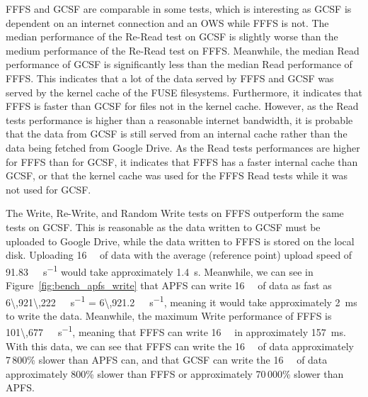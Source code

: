 \gls{FFFS} and \gls{GCSF} are comparable in some tests, which is interesting as \gls{GCSF} is dependent on an internet connection and an \gls{OWS} while \gls{FFFS} is not. The median performance of the \mbox{Re-Read} test on \gls{GCSF} is slightly worse than the medium performance of the \mbox{Re-Read} test on \gls{FFFS}. Meanwhile, the median Read performance of \gls{GCSF} is significantly less than the median Read performance of \gls{FFFS}. This indicates that a lot of the data served by \gls{FFFS} and \gls{GCSF} was served by the kernel cache of the \gls{FUSE} filesystems. Furthermore, it indicates that \gls{FFFS} is faster than \gls{GCSF} for files not in the kernel cache. However, as the Read tests performance is higher than a reasonable internet bandwidth, it is probable that the data from \gls{GCSF} is still served from an internal cache rather than the data being fetched from Google Drive. As the Read tests performances are higher for \gls{FFFS} than for \gls{GCSF}, it indicates that \gls{FFFS} has a faster internal cache than \gls{GCSF}, or that the kernel cache was used for the \gls{FFFS} Read tests while it was not used for \gls{GCSF}.

The Write, \mbox{Re-Write}, and Random Write tests on \gls{FFFS} outperform the same tests on \gls{GCSF}. This is reasonable as the data written to \gls{GCSF} must be uploaded to Google Drive, while the data written to \gls{FFFS} is stored on the local disk. Uploading \SI{16}{\mega\byte} of data with the average (reference point) upload speed of \SI[per-mode = symbol]{91.83}{\mega\bit\per\second} would take approximately \SI{1.4}{\second}. Meanwhile, we can see in Figure~\ref{fig:bench_apfs_write} that \gls{APFS} can write \SI{16}{\mega\byte} of data as fast as \SI[per-mode = symbol]{6\,921\,222}{\kilo\byte\per\second} = \SI[per-mode = symbol]{6\,921.2}{\mega\byte\per\second}, meaning it would take approximately \SI{2}{\milli\second} to write the data. Meanwhile, the maximum Write performance of \gls{FFFS} is \SI[per-mode = symbol]{101\,677}{\kilo\byte\per\second}, meaning that \gls{FFFS} can write \SI{16}{\mega\byte} in approximately \SI{157}{\milli\second}. With this data, we can see that \gls{FFFS} can write the \SI{16}{\mega\byte} of data approximately 7\,800\% slower than \gls{APFS} can, and that \gls{GCSF} can write the \SI{16}{\mega\byte} of data approximately 800\% slower than \gls{FFFS} or approximately 70\,000\% slower than \gls{APFS}. 

